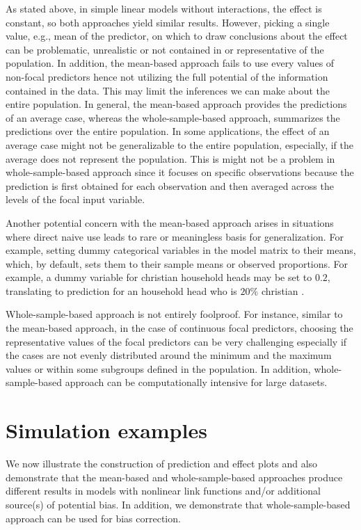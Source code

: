 As stated above, in simple linear models without interactions, the effect is constant, so both approaches yield similar results. However, picking a single value, e.g., mean of the predictor, on which to draw conclusions about the effect can be problematic, unrealistic or not contained in or representative of the population. In addition, the mean-based approach fails to use every values of non-focal predictors hence not utilizing the full potential of the information contained in the data. This may limit the inferences we can make about the entire population. In general, the mean-based approach provides the predictions of an average case, whereas the whole-sample-based approach, summarizes the predictions over the entire population. In some applications, the effect of an average case might not be generalizable to the entire population, especially, if the average does not represent the population. This is might not be a problem in whole-sample-based approach since it focuses on specific observations because the prediction is first obtained for each observation and then averaged across the levels of the focal input variable.


Another potential concern with the mean-based approach arises in situations where direct naive use leads to rare or meaningless basis for generalization. For example, setting dummy categorical variables in the model matrix to their means, which, by default, sets them to their sample means or observed proportions. For example, a dummy variable for christian household heads may be set to $0.2$, translating to prediction for an household head who is $20\%$ christian \citep{hanmer2013behind}.

Whole-sample-based approach is not entirely foolproof. For instance, similar to the mean-based approach, in the case of continuous focal predictors, choosing the representative values of the focal predictors can be very challenging especially if the cases are not evenly distributed around the minimum and the maximum values or within some subgroups defined in the population. In addition, whole-sample-based approach can be computationally intensive for large datasets.

\section{Simulation examples}

We now illustrate the construction of prediction and effect plots and also demonstrate that the mean-based and whole-sample-based approaches produce different results in models with nonlinear link functions and/or additional source(s) of potential bias. In addition, we demonstrate that whole-sample-based approach can be used for bias correction.

